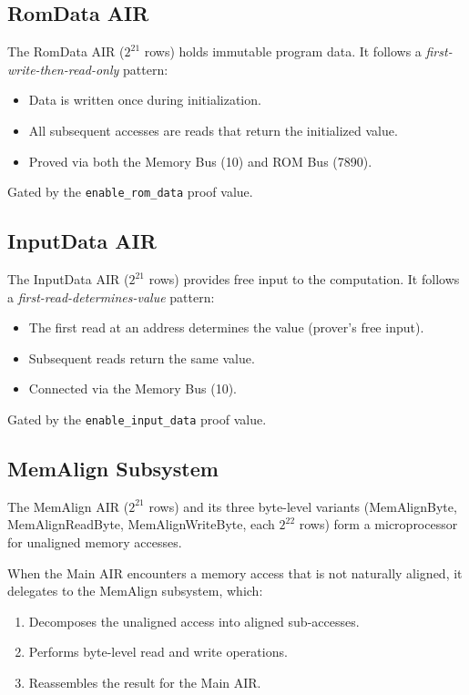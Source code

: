 \subsection{RomData AIR}
\label{sec:romdata}

The RomData AIR ($2^{21}$ rows) holds immutable program data.
It follows a \emph{first-write-then-read-only} pattern:
\begin{itemize}[nosep]
  \item Data is written once during initialization.
  \item All subsequent accesses are reads that return the initialized value.
  \item Proved via both the Memory Bus (10) and ROM Bus (7890).
\end{itemize}

Gated by the \texttt{enable\_rom\_data} proof value.

\subsection{InputData AIR}
\label{sec:inputdata}

The InputData AIR ($2^{21}$ rows) provides free input to the computation.
It follows a \emph{first-read-determines-value} pattern:
\begin{itemize}[nosep]
  \item The first read at an address determines the value (prover's free input).
  \item Subsequent reads return the same value.
  \item Connected via the Memory Bus (10).
\end{itemize}

Gated by the \texttt{enable\_input\_data} proof value.

\subsection{MemAlign Subsystem}
\label{sec:memalign}

The MemAlign AIR ($2^{21}$ rows) and its three byte-level variants
(MemAlignByte, MemAlignReadByte, MemAlignWriteByte, each $2^{22}$ rows)
form a microprocessor for unaligned memory accesses.

When the Main AIR encounters a memory access that is not naturally aligned,
it delegates to the MemAlign subsystem, which:
\begin{enumerate}[nosep]
  \item Decomposes the unaligned access into aligned sub-accesses.
  \item Performs byte-level read and write operations.
  \item Reassembles the result for the Main AIR.
\end{enumerate}


